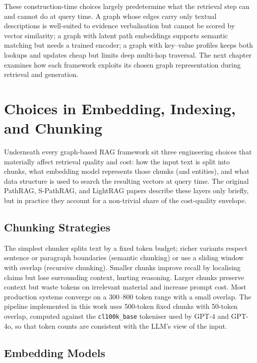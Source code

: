 \documentclass[12pt,a4paper,oneside]{report}
\begin{document}
These construction-time choices largely predetermine what the
retrieval step can and cannot do at query time. A graph whose edges
carry only textual descriptions is well-suited to evidence
verbalisation but cannot be scored by vector similarity; a graph with
latent path embeddings supports semantic matching but needs a trained
encoder; a graph with key--value profiles keeps both lookups and
updates cheap but limits deep multi-hop traversal. The next chapter
examines how each framework exploits its chosen graph representation
during retrieval and generation.

\section{Choices in Embedding, Indexing, and Chunking}
\label{sec:embedding_index_chunk}

Underneath every graph-based RAG framework sit three engineering
choices that materially affect retrieval quality and cost: how the
input text is split into chunks, what embedding model represents those
chunks (and entities), and what data structure is used to search the
resulting vectors at query time. The original PathRAG, S-PathRAG, and
LightRAG papers describe these layers only briefly, but in practice
they account for a non-trivial share of the cost-quality envelope.

\subsection{Chunking Strategies}

The simplest chunker splits text by a fixed token budget; richer
variants respect sentence or paragraph boundaries (semantic chunking)
or use a sliding window with overlap (recursive chunking). Smaller
chunks improve recall by localising claims but lose surrounding
context, hurting reasoning. Larger chunks preserve context but waste
tokens on irrelevant material and increase prompt cost. Most
production systems converge on a 300--800 token range with a small
overlap. The pipeline implemented in this work uses 500-token fixed
chunks with 50-token overlap, computed against the
\texttt{cl100k\_base} tokeniser used by GPT-4 and GPT-4o, so that
token counts are consistent with the LLM's view of the input.

\subsection{Embedding Models}
\end{document}

